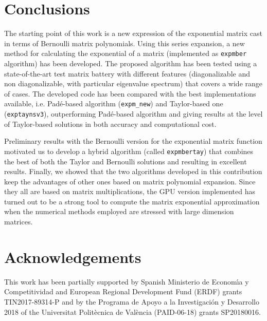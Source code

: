 \documentclass[preprint,10pt,numbers,sort&compress]{elsarticle}
\begin{document}
\section{Conclusions}
The starting point of this work is a new expression of the exponential matrix cast in terms of Bernoulli matrix polynomials. Using this series expansion, a new method for calculating the exponential of a matrix (implemented as \texttt{expmber} algorithm) has been developed. 
The proposed algorithm has been tested using a state-of-the-art test matrix battery with different features (diagonalizable and non diagonalizable, with particular eigenvalue spectrum) that covers a wide range of cases. The developed code has been compared with the best implementations available, i.e. Pad\'e-based algorithm (\texttt{expm\_new}) and Taylor-based one (\texttt{exptaynsv3}), outperforming Pad\'e-based algorithm and giving results at the level of Taylor-based solutions in both accuracy and computational cost. 

Preliminary results with the Bernoulli version for the exponential matrix function motivated us to develop a hybrid algorithm (called \texttt{expmbertay}) that combines the best of both the Taylor and Bernoulli solutions and resulting in excellent results. Finally, we showed that the two algorithms developed in this contribution keep the advantages of other ones based on matrix polynomial expansion. Since they all are based on matrix multiplications, the GPU version implemented has turned out to be a strong tool to compute the matrix exponential approximation when the numerical methods employed are stressed with large dimension matrices. 

\section*{Acknowledgements}
This work has been partially supported by Spanish Ministerio de Econom\'{\i}a y Competitividad and European Regional Development Fund (ERDF) grants TIN2017-89314-P
and by the Programa de Apoyo a la Investigaci\'on y Desarrollo 2018 of the Universitat Polit\`{e}cnica de Val\`{e}ncia (PAID-06-18) grants SP20180016.



\end{document}
